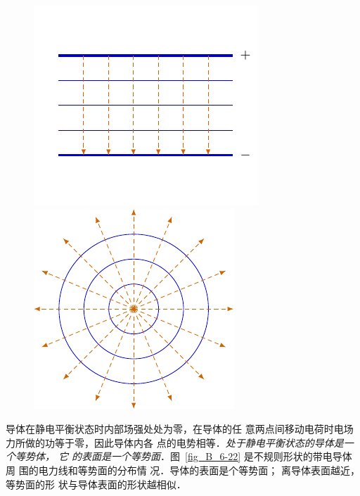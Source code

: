 \begin{figure}[htbp]
	\centering
	\begin{minipage}[t]{0.48\textwidth}
		\centering
		\includegraphics{fig/B/6-19.pdf}
		\caption{}\label{fig_B_6-19}
	\end{minipage}
	\begin{minipage}[t]{0.48\textwidth}
		\centering
		\includegraphics{fig/B/6-20.pdf}
		\caption{}\label{fig_B_6-20}
	\end{minipage}
\end{figure}



导体在静电平衡状态时内部场强处处为零，在导体的任
意两点间移动电荷时电场力所做的功等于零，因此导体内各
点的电势相等．\textit{处于静电平衡状态的导体是一个等势体，
它
的表面是一个等势面}．图~\ref{fig_B_6-22} 
是不规则形状的带电导体周
围的电力线和等势面的分布情
况．导体的表面是个等势面；
离导体表面越近，等势面的形
状与导体表面的形状越相似．

